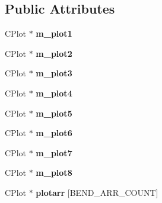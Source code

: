 \subsection*{Public Attributes}
\begin{DoxyCompactItemize}
\item 
\hypertarget{class_c_bend_a4b0cf84b5577236726d5e89c6cf0409a}{C\-Plot $\ast$ {\bfseries m\-\_\-plot1}}\label{class_c_bend_a4b0cf84b5577236726d5e89c6cf0409a}

\item 
\hypertarget{class_c_bend_afff46082fbb382a1df7ea0cfda77d723}{C\-Plot $\ast$ {\bfseries m\-\_\-plot2}}\label{class_c_bend_afff46082fbb382a1df7ea0cfda77d723}

\item 
\hypertarget{class_c_bend_a3410c19cd6c24469d9fd886668d5d419}{C\-Plot $\ast$ {\bfseries m\-\_\-plot3}}\label{class_c_bend_a3410c19cd6c24469d9fd886668d5d419}

\item 
\hypertarget{class_c_bend_a892dd5b646034f94ba57d9083a2db3c3}{C\-Plot $\ast$ {\bfseries m\-\_\-plot4}}\label{class_c_bend_a892dd5b646034f94ba57d9083a2db3c3}

\item 
\hypertarget{class_c_bend_a9ca2441b47f8d1ddeb6737b961023871}{C\-Plot $\ast$ {\bfseries m\-\_\-plot5}}\label{class_c_bend_a9ca2441b47f8d1ddeb6737b961023871}

\item 
\hypertarget{class_c_bend_a1522510af9e02464de452eb49fe80db0}{C\-Plot $\ast$ {\bfseries m\-\_\-plot6}}\label{class_c_bend_a1522510af9e02464de452eb49fe80db0}

\item 
\hypertarget{class_c_bend_ad702784fb7d5320ab5a48c54ba3a734a}{C\-Plot $\ast$ {\bfseries m\-\_\-plot7}}\label{class_c_bend_ad702784fb7d5320ab5a48c54ba3a734a}

\item 
\hypertarget{class_c_bend_a709b0cee968ee28f47f0baa5dde83fec}{C\-Plot $\ast$ {\bfseries m\-\_\-plot8}}\label{class_c_bend_a709b0cee968ee28f47f0baa5dde83fec}

\item 
\hypertarget{class_c_bend_aae978c904aa0620639fc5eb4c8994744}{C\-Plot $\ast$ {\bfseries plotarr} \mbox{[}B\-E\-N\-D\-\_\-\-A\-R\-R\-\_\-\-C\-O\-U\-N\-T\mbox{]}}\label{class_c_bend_aae978c904aa0620639fc5eb4c8994744}

\end{DoxyCompactItemize}


